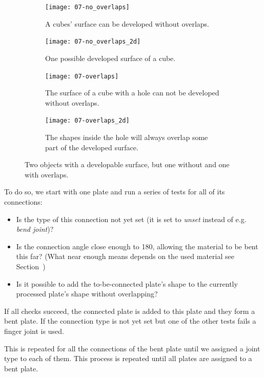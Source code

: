 \documentclass[../ClassicThesis.tex]{subfiles}
\begin{document}
\begin{figure}[h]
  \centering
  \begin{subfigure}[b]{0.49\textwidth}
    \centering
    \texttt{[image: 07-no\_overlaps]}
    \caption{A cubes' surface can be developed without overlaps.}
    \label{fig:overlaps:no-3d}
  \end{subfigure}
  \begin{subfigure}[b]{0.49\textwidth}
    \centering
    \texttt{[image: 07-no\_overlaps\_2d]}
    \caption{One possible developed surface of a cube.}
    \label{fig:overlapsh:no-2d}
  \end{subfigure}
  \begin{subfigure}[b]{0.49\textwidth}
    \centering
    \texttt{[image: 07-overlaps]}
    \caption{The surface of a cube with a hole can not be developed without overlaps.}
    \label{fig:overlaps:some-3d}
  \end{subfigure}
  \begin{subfigure}[b]{0.49\textwidth}
    \centering
    \texttt{[image: 07-overlaps\_2d]}
    \caption{The shapes inside the hole will always overlap some part of the developed surface.}
    \label{fig:overlaps:some-2d}
  \end{subfigure}
  \caption{Two objects with a developable surface, but one without and one with overlaps.}
  \label{fig:overlaps}
\end{figure}

To do so, we start with one plate and run a series of tests for all of its connections:
\begin{itemize}
\item Is the type of this connection not yet set (it is set to \emph{unset} instead of e.g. \emph{bend joint})?
\item Is the connection angle close enough to 180\textdegree{}, allowing the material to be bent this far? (What near enough means depends on the used material see Section~)
\item Is it possible to add the to-be-connected plate's shape to the currently processed plate's shape without overlapping?
\end{itemize}
If all checks succeed, the connected plate is added to this plate and they form a bent plate. If the connection type is not yet set but one of the other tests fails a finger joint is used.

This is repeated for all the connections of the bent plate until we assigned a joint type to each of them. This process is repeated until all plates are assigned to a bent plate.
\end{document}
